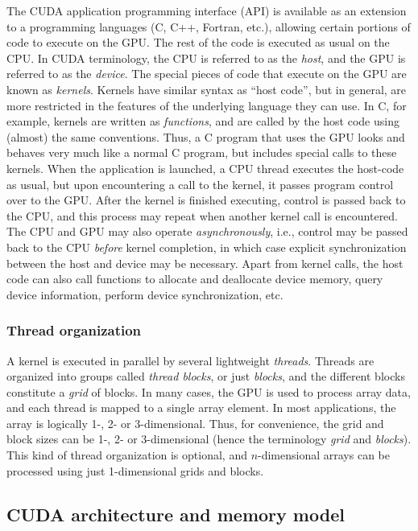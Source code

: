 The CUDA application programming interface (API)
is available as an extension to
a programming languages (C, C++, Fortran, etc.),
allowing certain portions of code to execute on the GPU.
The rest of the code is executed as usual on the CPU.
In CUDA terminology,
the CPU is referred to as the \emph{host},
and the GPU is referred to as the \emph{device}.
The special pieces of code
that execute on the GPU are known as \emph{kernels}.
Kernels have similar syntax
as ``host code'',
but in general,
are more restricted in the
features of the underlying language they can use.
In C, for example, kernels are written as \emph{functions},
and are called by the host code
using (almost) the same conventions.
Thus, a C program that uses the GPU
looks and behaves very much like a normal C program,
but includes special calls to these kernels.
When the application is launched,
a CPU thread executes the host-code as usual,
but upon encountering a call to the kernel,
it passes program control over to the GPU.
After the kernel is finished executing,
control is passed back to the CPU,
and this process may repeat when another kernel call is encountered.
The CPU and GPU may also operate \emph{asynchronously},
i.e.,
control may be passed back to the CPU \emph{before} kernel completion,
in which case
explicit synchronization between the host and device may be necessary.
Apart from kernel calls, the host code can also call functions to
allocate and deallocate device memory,
query device information,
perform device synchronization, etc.

\subsubsection{Thread organization}

A kernel is executed in parallel by
several lightweight \emph{threads}.
Threads are organized into groups called
\emph{thread blocks}, or just \emph{blocks},
and the different blocks constitute a
\emph{grid} of blocks.
In many cases,
the GPU is used to process array data,
and each thread is mapped to a single array element.
In most applications,
the array is logically 1-, 2- or 3-dimensional.
Thus, for convenience, the grid and block sizes
can be 1-, 2- or 3-dimensional
(hence the terminology \emph{grid} and \emph{blocks}).
This kind of thread organization is optional,
and $n$-dimensional arrays can be processed
using just 1-dimensional grids and blocks.

\subsection{CUDA architecture and memory model}

